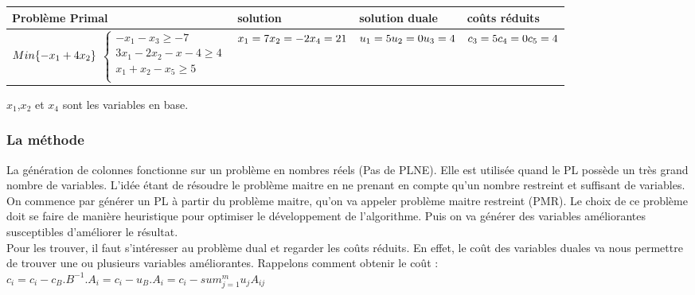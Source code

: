 \begin{tabular}{ p{5 cm}p{3 cm}p{3 cm}p{3 cm}}
 \hline
Problème Primal  & solution & solution duale & coûts réduits \\
 \hline
$Min\{-x_1 + 4x_2\} \newline$
$\left\lbrace
\begin{array}{l}
-x_1 -x_3\geq -7\\
3x_1-2x_2 -x -4\geq 4\\
x_1+x_2 -x_5 \geq 5\\
\end{array}
\right.$
& $x_1 = 7 \newline x_2 = -2 \newline x_4 = 21$ & $u_1 = 5 \newline u_2 = 0 \newline u_3 = 4$ & $c_3 = 5 \newline c_4 = 0 \newline c_5 = 4$ \\
 \hline
\end{tabular}

$x_1$,$x_2$ et $x_4$ sont les variables en base.
\subsubsection{La méthode}
La génération de colonnes fonctionne sur un problème en nombres réels (Pas de PLNE). Elle est utilisée quand le PL possède un très grand nombre de variables. L'idée étant de résoudre le problème maitre en ne prenant en compte qu'un nombre restreint et suffisant de variables.\\

On commence par générer un PL à partir du problème maitre, qu'on va appeler problème maitre restreint (PMR). Le choix de ce problème doit se faire de manière heuristique pour optimiser le développement de l'algorithme. Puis on va générer des variables améliorantes susceptibles d'améliorer le résultat.\\

Pour les trouver, il faut s'intéresser  au problème dual et regarder les coûts réduits. En effet, le coût des variables duales va nous permettre de trouver une ou plusieurs variables améliorantes.
Rappelons comment obtenir le coût :\\
\hspace*{2.5cm}$c_i = c_i - c_B.B^{-1}.A_i = c_i - u_B.A_i = c_i - sum_{j=1}^{m}{u_j A_{ij}}$\\

